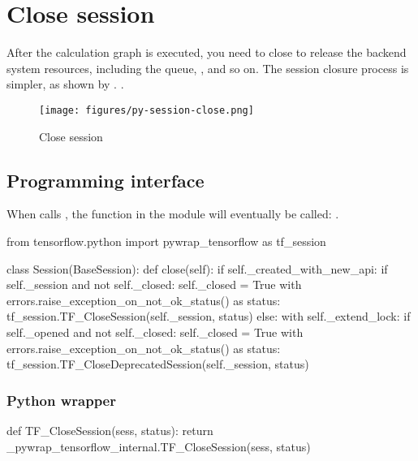 \section{Close session}
\begin{content}
After the calculation graph is executed, you need to close  to release the backend system resources, including the queue, , and so on. The session closure process is simpler, as shown by . .

\begin{figure}[H]
  \centering
  \texttt{[image: figures/py-session-close.png]}
  \caption{Close session}
  \label{fig:py-session-close}
\end{figure}


\subsection{Programming interface}
When  calls , the function in the  module will eventually be called: .

\begin{leftbar}
\begin{python}[caption={tensorflow/python/client/session.py}]
from tensorflow.python import pywrap_tensorflow as tf_session

class Session(BaseSession):
  def close(self):
    if self._created_with_new_api:
      if self._session and not self._closed:
        self._closed = True
        with errors.raise_exception_on_not_ok_status() as status:
          tf_session.TF_CloseSession(self._session, status)
    else:
      with self._extend_lock:
        if self._opened and not self._closed:
          self._closed = True
          with errors.raise_exception_on_not_ok_status() as status:
            tf_session.TF_CloseDeprecatedSession(self._session, status)
\end{python}
\end{leftbar}


\subsubsection{Python wrapper}

\begin{leftbar}
\begin{python}[caption={tensorflow/bazel-bin/tensorflow/python/pywrap\_tensorflow\_internal.py}]
def TF_CloseSession(sess, status):
    return _pywrap_tensorflow_internal.TF_CloseSession(sess, status)


\end{python}
\end{leftbar}
\end{content}
